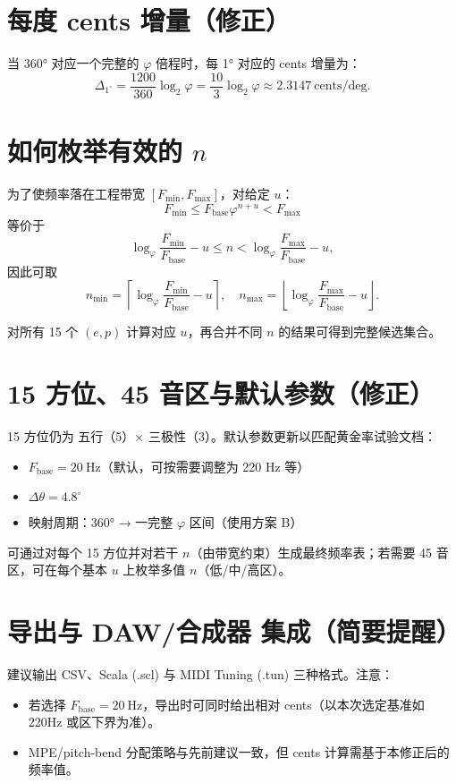 \documentclass{article}
\begin{document}
\section{每度 cents 增量（修正）}
当 360° 对应一个完整的 \(\varphi\) 倍程时，每 1° 对应的 cents 增量为：
\[
\Delta_{1^\circ} = \frac{1200}{360}\log_2\varphi
= \frac{10}{3}\log_2\varphi \approx 2.3147\ \text{cents/deg}.
\]

\section{如何枚举有效的 \(n\)}
为了使频率落在工程带宽 \([F_{\min},F_{\max}]\)，对给定 \(u\)：
\[
F_{\min}\le F_{\mathrm{base}}\varphi^{n+u}<F_{\max}
\]
等价于
\[
\log_{\varphi}\frac{F_{\min}}{F_{\mathrm{base}}}-u \le n < \log_{\varphi}\frac{F_{\max}}{F_{\mathrm{base}}}-u,
\]
因此可取
\[
n_{\min}=\left\lceil \log_{\varphi}\frac{F_{\min}}{F_{\mathrm{base}}}-u \right\rceil,\quad
n_{\max}=\left\lfloor \log_{\varphi}\frac{F_{\max}}{F_{\mathrm{base}}}-u \right\rfloor.
\]

对所有 15 个 \((e,p)\) 计算对应 \(u\)，再合并不同 \(n\) 的结果可得到完整候选集合。

\section{15 方位、45 音区与默认参数（修正）}
15 方位仍为 五行（5）× 三极性（3）。默认参数更新以匹配黄金率试验文档：
\begin{itemize}
  \item \(F_{\mathrm{base}} = 20\ \mathrm{Hz}\)（默认，可按需要调整为 220 Hz 等）
  \item \(\Delta\theta = 4.8^\circ\)
  \item 映射周期：360° → 一完整 \(\varphi\) 区间（使用方案 B）
\end{itemize}

可通过对每个 15 方位并对若干 \(n\)（由带宽约束）生成最终频率表；若需要 45 音区，可在每个基本 \(u\) 上枚举多值 \(n\)（低/中/高区）。

\section{导出与 DAW/合成器 集成（简要提醒）}
建议输出 CSV、Scala (.scl) 与 MIDI Tuning (.tun) 三种格式。注意：
\begin{itemize}
  \item 若选择 \(F_{\mathrm{base}}=20\ \mathrm{Hz}\)，导出时可同时给出相对 cents（以本次选定基准如 220Hz 或区下界为准）。
  \item MPE/pitch-bend 分配策略与先前建议一致，但 cents 计算需基于本修正后的频率值。
\end{itemize}
\end{document}
